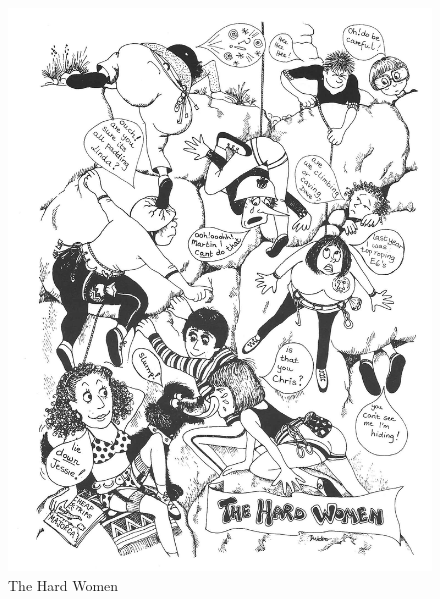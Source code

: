 \documentclass[a5paper,openany,font 10pt]{scrbook}
\begin{document}
\begin{figure}[htb]
\centering
\includegraphics[width=.9\linewidth]{./images/Cartoon_07.jpg}
\caption{\label{fig:orgf4acfcd}
The Hard Women}
\end{figure}
\end{document}
